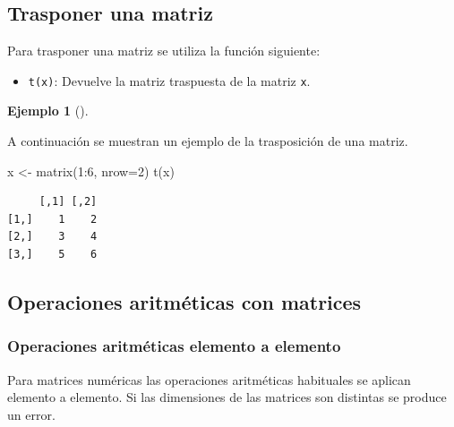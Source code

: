 \documentclass[
  a4paper,
]{scrreport}
\newenvironment{Shaded}{\begin{snugshade}}{\end{snugshade}}
\newcommand{\AttributeTok}[1]{\textcolor[rgb]{0.40,0.45,0.13}{#1}}
\newcommand{\DecValTok}[1]{\textcolor[rgb]{0.68,0.00,0.00}{#1}}
\newcommand{\FunctionTok}[1]{\textcolor[rgb]{0.28,0.35,0.67}{#1}}
\newcommand{\NormalTok}[1]{\textcolor[rgb]{0.00,0.23,0.31}{#1}}
\newcommand{\OtherTok}[1]{\textcolor[rgb]{0.00,0.23,0.31}{#1}}
\newcommand{\SpecialCharTok}[1]{\textcolor[rgb]{0.37,0.37,0.37}{#1}}
\providecommand{\tightlist}{%
  \setlength{\itemsep}{0pt}\setlength{\parskip}{0pt}}\usepackage{longtable,booktabs,array}
\theoremstyle{definition}
\theoremstyle{definition}
\newtheorem{example}{Ejemplo}[chapter]
\theoremstyle{remark}
\begin{document}
\hypertarget{trasponer-una-matriz}{%
\subsection{Trasponer una matriz}\label{trasponer-una-matriz}}

Para trasponer una matriz se utiliza la función siguiente:

\begin{itemize}
\tightlist
\item
  \texttt{t(x)}: Devuelve la matriz traspuesta de la matriz \texttt{x}.
\end{itemize}

\leavevmode{}%
\begin{example}[]\label{exm-trasposicion-matriz}

A continuación se muestran un ejemplo de la trasposición de una matriz.

\begin{Shaded}
\begin{Highlighting}[]
\NormalTok{x }\OtherTok{\textless{}{-}} \FunctionTok{matrix}\NormalTok{(}\DecValTok{1}\SpecialCharTok{:}\DecValTok{6}\NormalTok{, }\AttributeTok{nrow=}\DecValTok{2}\NormalTok{)}
\FunctionTok{t}\NormalTok{(x)}
\end{Highlighting}
\end{Shaded}

\begin{verbatim}
     [,1] [,2]
[1,]    1    2
[2,]    3    4
[3,]    5    6
\end{verbatim}

\end{example}

\hypertarget{operaciones-aritmuxe9ticas-con-matrices}{%
\subsection{Operaciones aritméticas con
matrices}\label{operaciones-aritmuxe9ticas-con-matrices}}

\hypertarget{operaciones-aritmuxe9ticas-elemento-a-elemento-1}{%
\subsubsection{Operaciones aritméticas elemento a
elemento}\label{operaciones-aritmuxe9ticas-elemento-a-elemento-1}}

Para matrices numéricas las operaciones aritméticas habituales se
aplican elemento a elemento. Si las dimensiones de las matrices son
distintas se produce un error.
\end{document}
